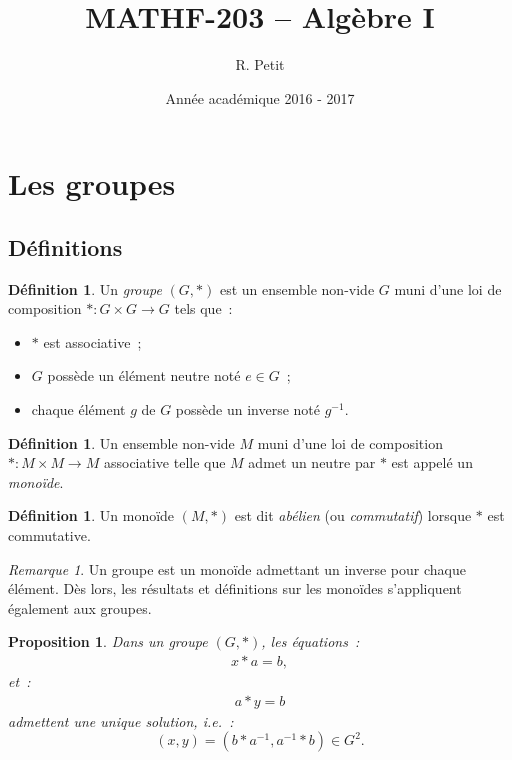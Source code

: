 \documentclass{article}
\title{MATHF-203 -- Algèbre I}
\date{Année académique 2016 - 2017}
\author{R. Petit}
\newtheorem{prp}[thm]{Proposition}
\theoremstyle{definition}
\newtheorem{déf}[thm]{Définition}
\theoremstyle{remark}
\newtheorem*{rmq}{Remarque}
\begin{document}
\maketitle
\tableofcontents
\newpage
{}
\setcounter{page}{1}

\section{Les groupes}
	\subsection{Définitions}
		\begin{déf} Un \textit{groupe} $(G, *)$ est un ensemble non-vide $G$ muni d'une loi de composition $* : G \times G \to G$ tels que~:
		\begin{itemize}
			\item $*$ est associative~;
			\item $G$ possède un élément neutre noté $e \in G$~;
			\item chaque élément $g$ de $G$ possède un inverse noté $g^{-1}$.
		\end{itemize}
		\end{déf}

		\begin{déf} Un ensemble non-vide $M$ muni d'une loi de composition $* : M \times M \to M$ associative telle que $M$ admet un neutre par $*$ est appelé
		un \textit{monoïde}.
		\end{déf}

		\begin{déf} Un monoïde $(M, *)$ est dit \textit{abélien} (ou \textit{commutatif}) lorsque $*$ est commutative.
		\end{déf}

		\begin{rmq} Un groupe est un monoïde admettant un inverse pour chaque élément. Dès lors, les résultats et définitions sur les monoïdes s'appliquent
		également aux groupes.
		\end{rmq}

		\begin{prp} Dans un groupe $(G, *)$, les équations~:
		\begin{align}\label{eq:xa=b}
			x*a = b,
		\end{align}
		et~:
		\begin{align}\label{eq:ay=b}
			a*y = b
		\end{align}
		admettent une unique solution, i.e.~:
		\[(x, y) = (b*a^{-1}, a^{-1}*b) \in G^2.\]
		\end{prp}
\end{document}
